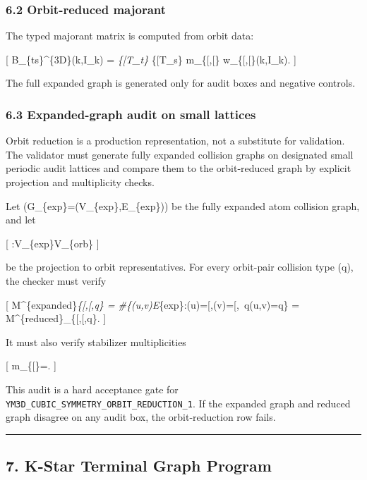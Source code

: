 \documentclass[
]{article}
\begin{document}
\subsubsection{6.2 Orbit-reduced majorant}\label{orbit-reduced-majorant}

The typed majorant matrix is computed from orbit data:

{[} B\_\{ts\}\^{}\{3D\}(k,I\_k) = \sum\emph{\{{[}\alpha{]}\in T\_t\}
\sum}\{{[}\beta{]}\in T\_s\} m\_\{{[}\alpha{]},{[}\beta{]}\}
w\_\{{[}\alpha{]},{[}\beta{]}\}(k,I\_k). {]}

The full expanded graph is generated only for audit boxes and negative
controls.

\subsubsection{6.3 Expanded-graph audit on small
lattices}\label{expanded-graph-audit-on-small-lattices}

Orbit reduction is a production representation, not a substitute for
validation. The validator must generate fully expanded collision graphs
on designated small periodic audit lattices and compare them to the
orbit-reduced graph by explicit projection and multiplicity checks.

Let (G\_\{\rm exp\}=(V\_\{\rm exp\},E\_\{\rm exp\})) be the fully
expanded atom collision graph, and let

{[} \pi:V\_\{\rm exp\}\to V\_\{\rm orb\} {]}

be the projection to orbit representatives. For every orbit-pair
collision type (q), the checker must verify

{[} M\^{}\{\rm expanded\}\emph{\{{[}\alpha{]},{[}\beta{]},q\} =
\#\{(u,v)\in E}\{\rm exp\}:\pi(u)={[}\alpha{]},\pi(v)={[}\beta{]},~q(u,v)=q\}
= M\^{}\{\rm reduced\}\_\{{[}\alpha{]},{[}\beta{]},q\}. {]}

It must also verify stabilizer multiplicities

{[}
m\_\{{[}\alpha{]}\}=.
{]}

This audit is a hard acceptance gate for
\texttt{YM3D\_CUBIC\_SYMMETRY\_ORBIT\_REDUCTION\_1}. If the expanded
graph and reduced graph disagree on any audit box, the orbit-reduction
row fails.

\begin{center}\rule{0.5\linewidth}{0.5pt}\end{center}

\subsection{7. K-Star Terminal Graph
Program}\label{k-star-terminal-graph-program}
\end{document}
